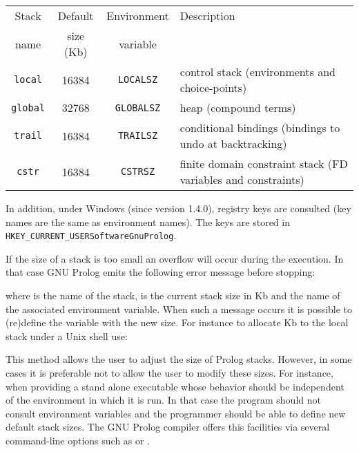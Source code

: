 \begin{tabular}{|c|c|c|l|}
\hline

Stack & Default   & Environment & Description \\
name  & size (Kb) & variable    & \\

\hline\hline

\texttt{local} & 16384 & \texttt{LOCALSZ} & control stack (environments
and choice-points) \\

\hline

\texttt{global} & 32768 & \texttt{GLOBALSZ} & heap (compound terms)
\\

\hline

\texttt{trail} & 16384 & \texttt{TRAILSZ} & conditional bindings (bindings
to undo at backtracking) \\

\hline

\texttt{cstr} & 16384 & \texttt{CSTRSZ} & finite domain constraint stack
(FD variables and constraints) \\

\hline
\end{tabular}

In addition, under Windows (since version 1.4.0), registry keys are consulted
(key names are the same as environment names). The keys are stored in
\texttt{HKEY\_CURRENT\_USER{\bs}Software{\bs}GnuProlog{\bs}}.

If the size of a stack is too small an overflow will occur during the
execution. In that case GNU Prolog emits the following error message before
stopping:


where  is the name of the stack,  is
the current stack size in Kb and  the name of the
associated environment variable. When such a message occurs it is possible
to (re)define the variable  with the new size. For
instance to allocate  Kb to the local stack under a Unix shell use:

\begin{CodeTwoCols}[6cm]
\end{CodeTwoCols}

This method allows the user to adjust the size of Prolog stacks. However, in
some cases it is preferable not to allow the user to modify these sizes. For
instance, when providing a stand alone executable whose behavior should be
independent of the environment in which it is run. In that case the program
should not consult environment variables and the programmer should be able
to define new default stack sizes. The GNU Prolog compiler offers this
facilities via several command-line options such as  or
 .

